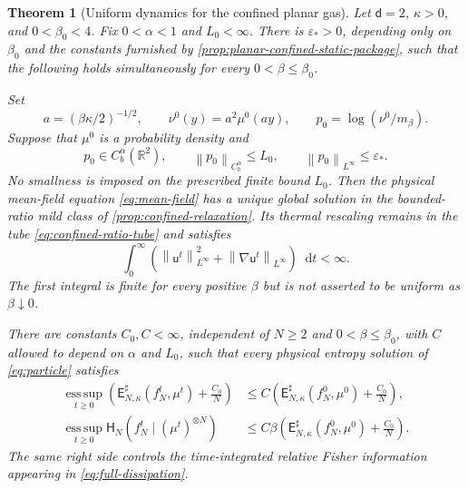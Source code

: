 \documentclass[11pt,reqno]{amsart}
\numberwithin{equation}{section}
\newtheorem{theorem}{Theorem}[section]
\theoremstyle{definition}
\theoremstyle{remark}
\newcommand{\R}{\mathbb R}
\renewcommand{\d}{\mathsf d}
\newcommand{\Hr}{\mathsf H}
\newcommand{\Er}{\mathsf E}
\renewcommand{\u}{\mathsf u}
\newcommand{\esssup}{\operatorname*{ess\,sup}}
\newcommand{\dd}{\mathop{}\!\mathrm d}
\newcommand{\norm}[1]{\left\lVert#1\right\rVert}
\begin{document}
\begin{theorem}[Uniform dynamics for the confined planar gas]\label{thm:planar-uniform}
Let $\d=2$, $\kappa>0$, and $0<\beta_0<4$. Fix $0<\alpha<1$ and $L_0<\infty$. There is $\varepsilon_*>0$, depending only on $\beta_0$ and the constants furnished by \cref{prop:planar-confined-static-package}, such that the following holds simultaneously for every $0<\beta\leq\beta_0$.

Set
\begin{equation}\label{eq:planar-thermal-scale}
 a=(\beta\kappa/2)^{-1/2},\qquad
 \nu^0(y)=a^2\mu^0(ay),\qquad
 p_0=\log(\nu^0/m_\beta).
\end{equation}
Suppose that $\mu^0$ is a probability density and
\begin{equation}\label{eq:planar-log-ratio-smallness}
 p_0\in C_b^\alpha(\R^2),
 \qquad \norm{p_0}_{C_b^\alpha}\leq L_0,
 \qquad \norm{p_0}_{L^\infty}\leq\varepsilon_*.
\end{equation}
No smallness is imposed on the prescribed finite bound $L_0$. Then the physical mean-field equation \eqref{eq:mean-field} has a unique global solution in the bounded-ratio mild class of \cref{prop:confined-relaxation}. Its thermal rescaling remains in the tube \eqref{eq:confined-ratio-tube} and satisfies
\begin{equation}\label{eq:planar-integrated-field}
 \int_0^\infty\left(
 \norm{\u^t}_{L^\infty}^2+\norm{\nabla \u^t}_{L^\infty}\right)\dd t<\infty.
\end{equation}
The first integral is finite for every positive $\beta$ but is not asserted to be uniform as $\beta\downarrow0$.

There are constants $C_0,C<\infty$, independent of $N\geq2$ and $0<\beta\leq\beta_0$, with $C$ allowed to depend on $\alpha$ and $L_0$, such that every physical entropy solution of \eqref{eq:particle} satisfies
\begin{align}
 \esssup_{t\geq0}\left(\Er_{N,\kappa}^{\sharp}(f_N^t,\mu^t)+\frac{C_0}{N}\right)
 &\leq C\left(\Er_{N,\kappa}^{\sharp}(f_N^0,\mu^0)+\frac{C_0}{N}\right),
 \label{eq:planar-uniform-energy}\\
 \esssup_{t\geq0}\Hr_N(f_N^t\mid(\mu^t)^{\otimes N})
 &\leq C\beta\left(\Er_{N,\kappa}^{\sharp}(f_N^0,\mu^0)+\frac{C_0}{N}\right).
 \label{eq:planar-uniform-entropy}
\end{align}
The same right side controls the time-integrated relative Fisher information appearing in \eqref{eq:full-dissipation}.


\end{theorem}
\end{document}
